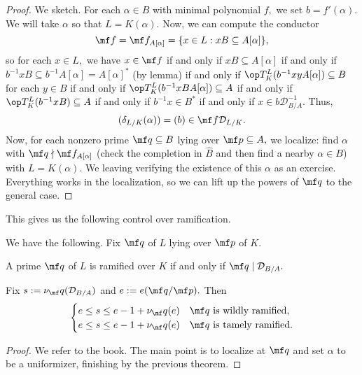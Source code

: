\documentclass[../notes.tex]{subfiles}
\begin{document}
\begin{proof}
	We sketch. For each $\alpha\in B$ with minimal polynomial $f,$ we set $b=f'(\alpha).$ We will take $\alpha$ so that $L=K(\alpha).$ Now, we can compute the conductor
	\[\mf f=\mf f_{A[\alpha]}=\{x\in L:xB\subseteq A[\alpha]\},\]
	so for each $x\in L,$ we have $x\in\mf f$ if and only if $xB\subseteq A[\alpha]$ if and only if $b^{-1}xB\subseteq b^{-1}A[\alpha]=A[\alpha]^*$ (by lemma) if and only if $\op T^L_K(b^{-1}xyA[\alpha])\subseteq B$ for each $y\in B$ if and only if $\op T^L_K(b^{-1}xBA[\alpha])\subseteq A$ if and only if $\op T^L_K(b^{-1}xB)\subseteq A$ if and only if $b^{-1}x\in B^*$ if and only if $x\in b\mathcal D_{B/A}^{-1}.$ Thus,
	\[(\delta_{L/K}(\alpha))=(b)\in\mf f\mathcal D_{L/K}.\]
	Now, for each nonzero prime $\mf q\subseteq B$ lying over $\mf p\subseteq A,$ we localize: find $\alpha$ with $\mf q\nmid\mf f_{A[\alpha]}$ (check the completion in $\hat B$ and then find a nearby $\alpha\in B$) with $L=K(\alpha).$ We leaving verifying the existence of this $\alpha$ as an exercise. Everything works in the localization, so we can lift up the powers of $\mf q$ to the general case.\todo{}
\end{proof}

This gives us the following control over ramification.
\begin{theorem}
	We have the following. Fix $\mf q$ of $L$ lying over $\mf p$ of $K.$
	\begin{listalph}
		\item A prime $\mf q$ of $L$ is ramified over $K$ if and only if $\mf q\mid\mathcal D_{B/A}.$
		\item Fix $s:=\nu_\mf q(\mathcal D_{B/A})$ and $e:=e(\mf q/\mf p).$ Then
		\[\begin{cases}
			e\le s\le e-1+\nu_\mf q(e) & \mf q\text{ is wildly ramified}, \\
			e\le s\le e-1+\nu_\mf q(e) & \mf q\text{ is tamely ramified}.
		\end{cases}\]
	\end{listalph}
\end{theorem}
\begin{proof}
	We refer to the book. The main point is to localize at $\mf q$ and set $\alpha$ to be a uniformizer, finishing by the previous theorem.
\end{proof}
\end{document}
